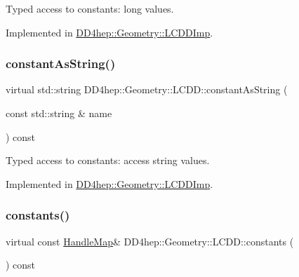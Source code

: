 Typed access to constants\+: long values. 



Implemented in \hyperlink{class_d_d4hep_1_1_geometry_1_1_l_c_d_d_imp_a0cfd631c5633b9296724984af3033a86}{D\+D4hep\+::\+Geometry\+::\+L\+C\+D\+D\+Imp}.

\hypertarget{class_d_d4hep_1_1_geometry_1_1_l_c_d_d_a6857611520c86f1d242a1698ab5c181f}{}\label{class_d_d4hep_1_1_geometry_1_1_l_c_d_d_a6857611520c86f1d242a1698ab5c181f} 
\subsubsection{\texorpdfstring{constant\+As\+String()}{constantAsString()}}
{\footnotesize\ttfamily virtual std\+::string D\+D4hep\+::\+Geometry\+::\+L\+C\+D\+D\+::constant\+As\+String (\begin{DoxyParamCaption}\item[{const std\+::string \&}]{name }\end{DoxyParamCaption}) const\hspace{0.3cm}{\ttfamily [pure virtual]}}



Typed access to constants\+: access string values. 



Implemented in \hyperlink{class_d_d4hep_1_1_geometry_1_1_l_c_d_d_imp_a57650b5d0dc1d689287959a0d068e5a8}{D\+D4hep\+::\+Geometry\+::\+L\+C\+D\+D\+Imp}.

\hypertarget{class_d_d4hep_1_1_geometry_1_1_l_c_d_d_a14d6ac1a5de3cd514372ab8717b6420e}{}\label{class_d_d4hep_1_1_geometry_1_1_l_c_d_d_a14d6ac1a5de3cd514372ab8717b6420e} 
\subsubsection{\texorpdfstring{constants()}{constants()}}
{\footnotesize\ttfamily virtual const \hyperlink{class_d_d4hep_1_1_geometry_1_1_l_c_d_d_a05cb11e7355772c7b0794bcca59bf477}{Handle\+Map}\& D\+D4hep\+::\+Geometry\+::\+L\+C\+D\+D\+::constants (\begin{DoxyParamCaption}{ }\end{DoxyParamCaption}) const\hspace{0.3cm}{\ttfamily [pure virtual]}}



